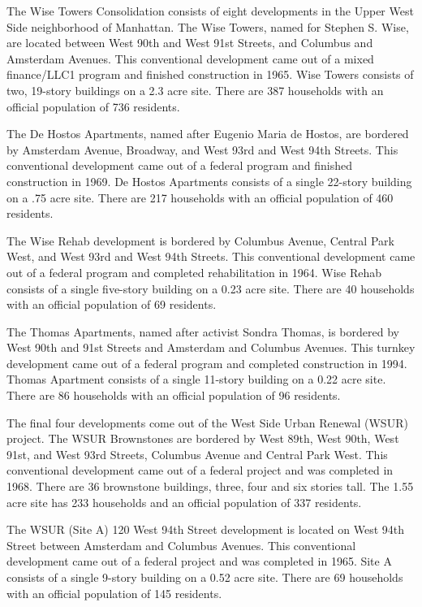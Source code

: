 
The Wise Towers Consolidation consists of eight developments in the Upper West Side neighborhood of Manhattan. The Wise Towers, named for Stephen S. Wise, are located between West 90th and West 91st Streets, and Columbus and Amsterdam Avenues. This conventional development came out of a mixed finance/LLC1 program and finished construction in 1965. Wise Towers consists of two, 19-story buildings on a 2.3 acre site. There are 387 households with an official population of 736 residents. 

The De Hostos Apartments, named after Eugenio Maria de Hostos, are bordered by Amsterdam Avenue, Broadway, and West 93rd and West 94th Streets. This conventional development came out of a federal program and finished construction in 1969. De Hostos Apartments consists of a single 22-story building on a .75 acre site. There are 217 households with an official population of 460 residents.

The Wise Rehab development is bordered by Columbus Avenue, Central Park West, and West 93rd and West 94th Streets. This conventional development came out of a federal program and completed rehabilitation in 1964. Wise Rehab consists of a single five-story building on a 0.23 acre site. There are 40 households with an official population of 69 residents.

The Thomas Apartments, named after activist Sondra Thomas, is bordered by West 90th and 91st Streets and Amsterdam and Columbus Avenues. This turnkey development came out of a federal program and completed construction in 1994. Thomas Apartment consists of a single 11-story building on a 0.22 acre site. There are 86 households with an official population of 96 residents. 

The final four developments come out of the West Side Urban Renewal (WSUR) project. The WSUR Brownstones are bordered by West 89th, West 90th, West 91st, and West 93rd Streets, Columbus Avenue and Central Park West. This conventional development came out of a federal project and was completed in 1968. There are 36 brownstone buildings, three, four and six stories tall. The 1.55 acre site has 233 households and an official population of 337 residents. 

The WSUR (Site A) 120 West 94th Street development is located on West 94th Street between Amsterdam and Columbus Avenues. This conventional development came out of a federal project and was completed in 1965. Site A consists of a single 9-story building on a 0.52 acre site. There are 69 households with an official population of 145 residents.

